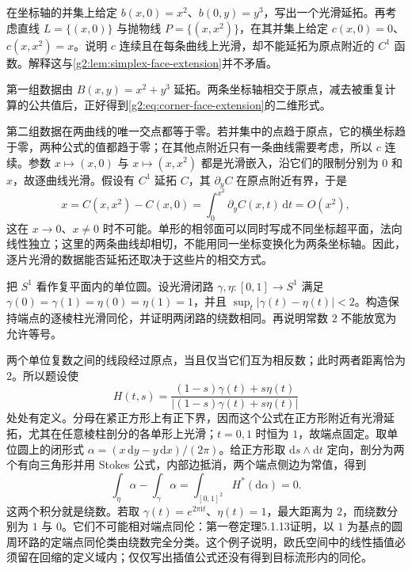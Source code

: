 \begin{exercise}\label{g2:ex:transverse-face-extension}
	在坐标轴的并集上给定 \(b(x,0)=x^2\)、\(b(0,y)=y^3\)，写出一个光滑延拓。再考虑直线 \(L=\{(x,0)\}\) 与抛物线 \(P=\{(x,x^2)\}\)，在其并集上给定 \(c(x,0)=0\)、\(c(x,x^2)=x\)。说明 \(c\) 连续且在每条曲线上光滑，却不能延拓为原点附近的 \(C^1\) 函数。解释这与\cref{g2:lem:simplex-face-extension}并不矛盾。
\end{exercise}
\begin{solution}
	第一组数据由 \(B(x,y)=x^2+y^3\) 延拓。两条坐标轴相交于原点，减去被重复计算的公共值后，正好得到\cref{g2:eq:corner-face-extension}的二维形式。

	第二组数据在两曲线的唯一交点都等于零。若并集中的点趋于原点，它的横坐标趋于零，两种公式的值都趋于零；在其他点附近只有一条曲线需要考虑，所以 \(c\) 连续。参数 \(x\mapsto(x,0)\) 与 \(x\mapsto(x,x^2)\) 都是光滑嵌入，沿它们的限制分别为 \(0\) 和 \(x\)，故逐曲线光滑。假设有 \(C^1\) 延拓 \(C\)，其 \(\partial_yC\) 在原点附近有界，于是
	\[
		x=C(x,x^2)-C(x,0)=\int_0^{x^2}\partial_yC(x,t)\,\mathrm{d}t=O(x^2),
	\]
	这在 \(x\to0\)、\(x\ne0\) 时不可能。单形的相邻面可以同时写成不同坐标超平面，法向线性独立；这里的两条曲线却相切，不能用同一坐标变换化为两条坐标轴。因此，逐片光滑的数据能否延拓还取决于这些片的相交方式。
\end{solution}

\begin{exercise}\label{g2:ex:close-circle-loops}
	把 \(S^1\) 看作复平面内的单位圆。设光滑闭路 \(\gamma,\eta:[0,1]\to S^1\) 满足 \(\gamma(0)=\gamma(1)=\eta(0)=\eta(1)=1\)，并且 \(\sup_t|\gamma(t)-\eta(t)|<2\)。构造保持端点的逐棱柱光滑同伦，并证明两闭路的绕数相同。再说明常数 \(2\) 不能放宽为允许等号。
\end{exercise}
\begin{solution}
	两个单位复数之间的线段经过原点，当且仅当它们互为相反数；此时两者距离恰为 \(2\)。所以题设使
	\[
		H(t,s)=\frac{(1-s)\gamma(t)+s\eta(t)}{|(1-s)\gamma(t)+s\eta(t)|}
	\]
	处处有定义。分母在紧正方形上有正下界，因而这个公式在正方形附近有光滑延拓，尤其在任意棱柱剖分的各单形上光滑；\(t=0,1\) 时恒为 \(1\)，故端点固定。取单位圆上的闭形式 \(\alpha=(x\,\mathrm{d}y-y\,\mathrm{d}x)/(2\pi)\)。给正方形取 \(\mathrm{d}s\wedge\mathrm{d}t\) 定向，剖分为两个有向三角形并用 Stokes 公式，内部边抵消，两个端点侧边为常值，得到
	\[
		\int_\eta\alpha-\int_\gamma\alpha=\int_{[0,1]^2}H^*(\mathrm{d}\alpha)=0.
	\]
	这两个积分就是绕数。若取 \(\gamma(t)=e^{2\pi\mathrm{i}t}\)、\(\eta(t)=1\)，最大距离为 \(2\)，而绕数分别为 \(1\) 与 \(0\)。它们不可能相对端点同伦：第一卷定理5.1.13证明，以 \(1\) 为基点的圆周环路的定端点同伦类由绕数完全分类。这个例子说明，欧氏空间中的线性插值必须留在回缩的定义域内；仅仅写出插值公式还没有得到目标流形内的同伦。
\end{solution}


